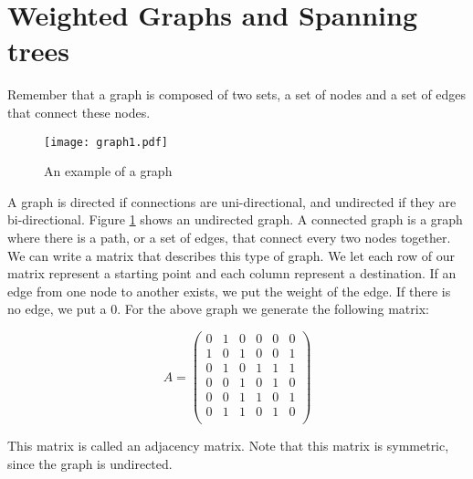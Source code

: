 %


\label{Ch:Kruskal}


\section*{Weighted Graphs and Spanning trees}

Remember that a graph is composed of two sets, a set of nodes and a set of edges that connect these nodes. 

\begin{figure}[H]
\texttt{[image: graph1.pdf]}
\caption{An example of a graph}
\label{mst:graph1}
\end{figure}

A graph is directed if connections are uni-directional, and undirected if they are bi-directional.
Figure \ref{mst:graph1} shows an undirected graph.
A connected graph is a graph where there is a path, or a set of edges, that connect every two nodes together.
We can write a matrix that describes this type of graph.
We let each row of our matrix represent a starting point and each column represent a destination.
If an edge from one node to another exists, we put the weight of the edge.
If there is no edge, we put a 0.
For the above graph we generate the following matrix:

\[
A = \begin{pmatrix}
0 & 1 & 0 & 0 & 0 & 0\\
1 & 0 & 1 & 0 & 0 & 1\\
0 & 1 & 0 & 1 & 1 & 1\\
0 & 0 & 1 & 0 & 1 & 0\\
0 & 0 & 1 & 1 & 0 & 1\\
0 & 1 & 1 & 0 & 1 & 0\\
\end{pmatrix}
\]

This matrix is called an adjacency matrix.
Note that this matrix is symmetric, since the graph is undirected. 

